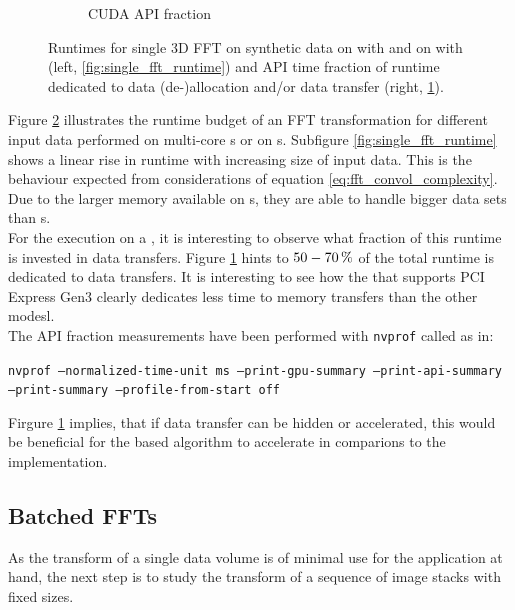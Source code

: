 \begin{figure}[h]
\begin{subfigure}[b]{0.45\textwidth}
    \caption{CUDA API fraction}
    \label{fig:single_fft_api_fraction}
  \end{subfigure}
  \hfill
  \caption{Runtimes for single 3D FFT on synthetic data on \cpu{} with \fftw{} and on \gpu{} with \cufft{} (left, \ref{fig:single_fft_runtime}) and API time fraction of runtime dedicated to data (de-)allocation and/or data transfer (right, \ref{fig:single_fft_api_fraction}).}
  \label{fig:rt_single_fft}
\end{figure}

Figure \ref{fig:rt_single_fft} illustrates the runtime budget of an FFT transformation for different input data performed on multi-core \cpu{}s or on \gpu{}s. Subfigure \ref{fig:single_fft_runtime} shows a linear rise in runtime with increasing size of input data. This is the behaviour expected from considerations of equation \ref{eq:fft_convol_complexity}. Due to the larger memory available on \cpu{}s, they are able to handle bigger data sets than \gpu{}s.\\

For the execution on a \gpu{}, it is interesting to observe what fraction of this runtime is invested in data transfers. Figure \ref{fig:single_fft_api_fraction} hints to $\unit[50-70]{\%}$ of the total runtime is dedicated to data transfers. It is interesting to see how the \gpu{} that supports PCI Express Gen3 clearly dedicates less time to memory transfers than the other modesl. \\

The API fraction measurements have been performed with \texttt{nvprof} called as in:\newline
\begin{center}
  \texttt{nvprof --normalized-time-unit ms --print-gpu-summary --print-api-summary --print-summary --profile-from-start off}\newline
\end{center}

Firgure \ref{fig:single_fft_api_fraction} implies, that if data transfer can be hidden or accelerated, this would be beneficial for the \gpu{} based algorithm to accelerate in comparions to the \cpu{} implementation.

\clearpage
\subsection{Batched FFTs}
As the transform of a single data volume is of minimal use for the application at hand, the next step is to study the transform of a sequence of image stacks with fixed sizes.

